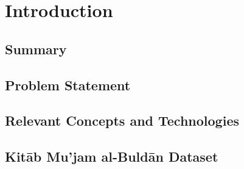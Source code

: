 

\chapter{Introduction}\label{ch:introduction}

\section{Summary}\label{sec:summary}


\section{Problem Statement}\label{sec:problem-statement}


\section{Relevant Concepts and Technologies}\label{sec:relevant-concepts}


\section{Kitāb Mu'jam al-Buldān Dataset}\label{sec:yagut}




